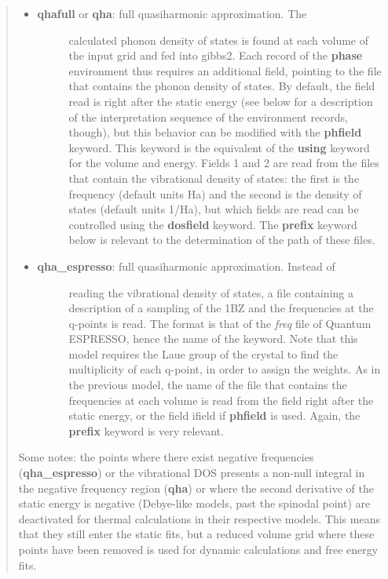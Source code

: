 \documentclass[a4paper]{article}
\begin{document}
\begin{itemize}
\begin{quote}
\begin{itemize}
\item 
\begin{description}
\item[{\textbf{qhafull} or \textbf{qha}: full quasiharmonic approximation. The}] \leavevmode 
calculated phonon density of states is found at each volume of
the input grid and fed into gibbs2. Each record of the
\textbf{phase} environment thus requires an additional field,
pointing to the file that contains the phonon density of
states. By default, the field read is right after the static
energy (see below for a description of the interpretation
sequence of the environment records, though), but this
behavior can be modified with the \textbf{phfield} keyword. This
keyword is the equivalent of the \textbf{using} keyword for the
volume and energy. Fields 1 and 2 are read from the files that
contain the vibrational density of states: the first is the
frequency (default units Ha) and the second is the density of
states (default units 1/Ha), but which fields are read can be
controlled using the \textbf{dosfield} keyword. The \textbf{prefix}
keyword below is relevant to the determination of the path of
these files.

\end{description}

\item 
\begin{description}
\item[{\textbf{qha\_espresso}: full quasiharmonic approximation. Instead of}] \leavevmode 
reading the vibrational density of states, a file containing a
description of a sampling of the 1BZ and the frequencies at the
q-points is read. The format is that of the \emph{freq} file of
Quantum ESPRESSO, hence the name of the keyword. Note that this
model requires the Laue group of the crystal to find the
multiplicity of each q-point, in order to assign the
weights. As in the previous model, the name of the file that
contains the frequencies at each volume is read from the field
right after the static energy, or the field ifield if
\textbf{phfield} is used. Again, the \textbf{prefix} keyword is very
relevant.

\end{description}
\end{itemize}

Some notes: the points where there exist negative
frequencies (\textbf{qha\_espresso}) or the vibrational DOS presents a
non-null integral in the negative frequency region (\textbf{qha}) or
where the second derivative of the static energy is negative
(Debye-like models, past the spinodal point) are deactivated for
thermal calculations in their respective models. This means that
they still enter the static fits, but a reduced volume grid where
these points have been removed is used for dynamic calculations and
free energy fits.


\end{quote}
\end{itemize}
\end{document}
